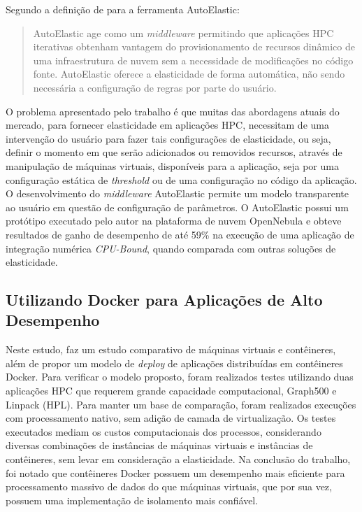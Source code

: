 \documentclass[twoside,english,brazilian]{UNISINOSartigo}
\begin{document}
\begin{itemize}
Segundo a definição de  para a ferramenta AutoElastic:
\begin{quote}
AutoElastic age como um \textit{middleware} permitindo que aplicações HPC iterativas obtenham vantagem do provisionamento de recursos dinâmico de uma infraestrutura de nuvem sem a necessidade de modificações no código fonte. AutoElastic oferece a elasticidade de forma automática, não sendo necessária a configuração de regras por parte do usuário.
\end{quote} 
O problema apresentado pelo trabalho é que muitas das abordagens atuais do mercado, para fornecer elasticidade em aplicações HPC, necessitam de uma intervenção do usuário para fazer tais configurações de elasticidade, ou seja, definir o momento em que serão adicionados ou removidos recursos, através de manipulação de máquinas virtuais, disponíveis para a aplicação, seja por uma configuração estática de \textit{threshold} ou de uma configuração no código da aplicação. O desenvolvimento do \textit{middleware} AutoElastic permite um modelo transparente ao usuário em questão de configuração de parâmetros. O AutoElastic possui um protótipo executado pelo autor na plataforma de nuvem OpenNebula e obteve resultados de ganho de desempenho de até 59\% na execução de uma aplicação de integração numérica \textit{CPU-Bound}, quando comparada com outras soluções de elasticidade. 

\subsection{Utilizando Docker para Aplicações de Alto Desempenho}
\label{trabdocker1}
Neste estudo,  faz um estudo comparativo de máquinas virtuais e contêineres, além de propor um modelo de \textit{deploy} de aplicações distribuídas em contêineres Docker. Para verificar o modelo proposto, foram realizados testes utilizando duas aplicações HPC que requerem grande capacidade computacional, Graph500 e Linpack (HPL). Para manter um base de comparação, foram realizados execuções com processamento nativo, sem adição de camada de virtualização. Os testes executados mediam os custos computacionais dos processos, considerando diversas combinações de instâncias de máquinas virtuais e instâncias de contêineres, sem levar em consideração a elasticidade. Na conclusão do trabalho, foi notado que contêineres Docker possuem um desempenho mais eficiente para processamento massivo de dados do que máquinas virtuais, que por sua vez, possuem uma implementação de isolamento mais confiável. 


\end{itemize}
\end{document}

